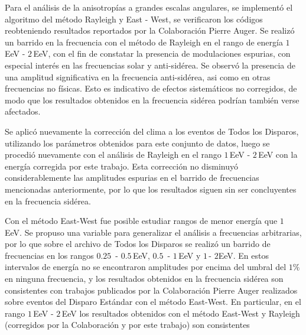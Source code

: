 Para el análisis de la anisotropías a grandes escalas angulares, se implementó el algoritmo del método Rayleigh  y East - West, se verificaron los códigos reobteniendo resultados reportados por la Colaboración Pierre Auger. Se realizó un barrido en la frecuencia con el método de Rayleigh en el rango de energía $1\,$EeV - $2\,$EeV, con el fin de constatar la presencia de modulaciones espurias, con especial interés en las frecuencias solar y anti-sidérea. Se observó la presencia de una amplitud significativa en la frecuencia anti-sidérea, asi como en otras frecuencias no físicas. Esto es indicativo de efectos sistemáticos no corregidos, de modo que los resultados obtenidos en la frecuencia sidérea podrían también verse afectados.

Se aplicó nuevamente la corrección del clima a los eventos de Todos los Disparos, utilizando los parámetros obtenidos para este conjunto de datos,  luego se procedió nuevamente con el análisis de Rayleigh en el rango $1\,$EeV - $2\,$EeV con la energía corregida por este trabajo. Esta corrección no disminuyó considerablemente las amplitudes espurias en el barrido de frecuencias mencionadas anteriormente, por lo que los resultados siguen sin ser concluyentes en la frecuencia sidérea.

Con el método East-West fue posible estudiar rangos de menor energía que $1\,$EeV. Se propuso una variable para generalizar el análisis a frecuencias arbitrarias, por lo que sobre el archivo de Todos los Disparos se realizó un barrido de frecuencias en  los rangos $0.25\,$ - $0.5\,$EeV, $0.5\,$ - $1\,$EeV y $1\,$- $2$EeV. En estos intervalos de energía no se encontraron amplitudes por encima del umbral del $1\%$ en ninguna frecuencia, y los  resultados obtenidos en la frecuencia sidérea son consistentes con trabajos publicados por la Colaboración Pierre Auger realizados sobre eventos del Disparo Estándar con el método East-West. En particular, en el rango $1\,$EeV - $2\,$EeV los resultados obtenidos con el método East-West y Rayleigh (corregidos por la Colaboración y por este trabajo) son consistentes


